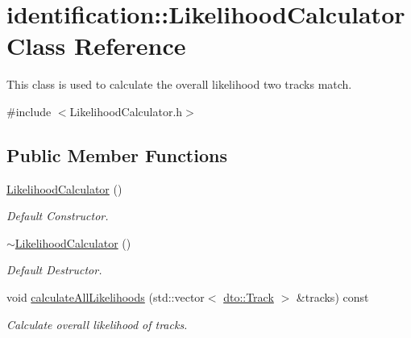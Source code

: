 \hypertarget{classidentification_1_1_likelihood_calculator}{}\section{identification\+:\+:Likelihood\+Calculator Class Reference}
\label{classidentification_1_1_likelihood_calculator}


This class is used to calculate the overall likelihood two tracks match.  




{\ttfamily \#include $<$Likelihood\+Calculator.\+h$>$}

\subsection*{Public Member Functions}
\begin{DoxyCompactItemize}
\item 
\mbox{\label{classidentification_1_1_likelihood_calculator_aa4f57b574ffc99ccd1cb957abe9c152c}} 
\mbox{\hyperlink{classidentification_1_1_likelihood_calculator_aa4f57b574ffc99ccd1cb957abe9c152c}{Likelihood\+Calculator}} ()
\begin{DoxyCompactList}\small\item\em Default Constructor. \end{DoxyCompactList}\item 
\mbox{\label{classidentification_1_1_likelihood_calculator_a494ef500eed3a6aaa0dbe2be2ea12a91}} 
\mbox{\hyperlink{classidentification_1_1_likelihood_calculator_a494ef500eed3a6aaa0dbe2be2ea12a91}{$\sim$\+Likelihood\+Calculator}} ()
\begin{DoxyCompactList}\small\item\em Default Destructor. \end{DoxyCompactList}\item 
\mbox{\label{classidentification_1_1_likelihood_calculator_a51c31a4c748f9c79ce41ca94a6ef75ad}} 
void \mbox{\hyperlink{classidentification_1_1_likelihood_calculator_a51c31a4c748f9c79ce41ca94a6ef75ad}{calculate\+All\+Likelihoods}} (std\+::vector$<$ \mbox{\hyperlink{structdto_1_1_track}{dto\+::\+Track}} $>$ \&tracks) const
\begin{DoxyCompactList}\small\item\em Calculate overall likelihood of tracks. \end{DoxyCompactList}\end{DoxyCompactItemize}



